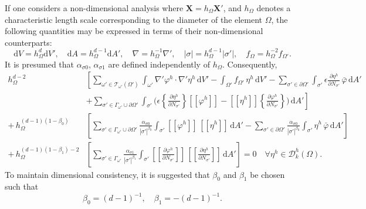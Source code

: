 	If one considers a non-dimensional analysis where $\bm{X} = h_\Omega \bm{X}'$, and $h_\Omega$ denotes a characteristic length scale corresponding to the diameter of the element $\Omega$, the following quantities may be expressed in terms of their non-dimensional counterparts:
    \begin{equation}
        \mathrm dV = h_\Omega^d \mathrm dV', \quad \mathrm dA = h_\Omega^{d-1} \mathrm dA', \quad \nabla = h_\Omega^{-1} \nabla', \quad |\sigma| = h_\Omega^{d-1} |\sigma'|, \quad f_{\Omega} = h_\Omega^{-2} f_{\Omega'}.
    \end{equation}
    It is presumed that $\alpha_{\sigma0}$, $\alpha_{\sigma1}$ are defined independently of $h_\Omega$. Consequently,
    \begin{align}
		h_\Omega^{d-2} & \left[ \sum_{\omega' \in \mathcal{T}_{\omega'} (\Omega')} \int_{\omega'} \nabla' \varphi^h \cdot \nabla' \eta^h \, \mathrm dV' - \int_{\Omega'} f_{\Omega'} \, \eta^h \, \mathrm dV' - \sum_{\sigma' \in \partial \Omega'} \int_{\sigma'} \epsilon \frac{\partial \eta^h}{\partial N_{\sigma'}} \, \bar{\varphi} \, \mathrm dA' \right. \nonumber \\ 
		& \left. + \sum_{\sigma' \in \Gamma_{\omega'} \cup \partial \Omega'} \int_{\sigma'} \bigg( \epsilon \left\{ \frac{\partial \eta^h}{\partial N_{\sigma'}} \right\} [\![ \varphi^h ]\!] - [\![ \eta^h ]\!] \left\{ \frac{\partial \varphi^h}{\partial N_{\sigma'}} \right\} \bigg) \, \mathrm dA' \right] \nonumber \\ 
		+ \, h_\Omega^{(d-1)(1-\beta_0)} & \left[ \sum_{\sigma' \in \Gamma_{\omega'} \cup \partial \Omega'} \frac{\alpha_{\sigma0}}{|\sigma'|^{\beta_0}} \int_{\sigma'} [\![ \varphi^h ]\!] \, [\![ \eta^h ]\!] \, \mathrm dA' - \sum_{\sigma' \in \partial \Omega'} \frac{\alpha_{\sigma0}}{|\sigma'|^{\beta_0}} \int_{\sigma'} \eta^h \, \bar{\varphi} \, \mathrm dA' \right] \nonumber \\ 
		+ \, h_\Omega^{(d-1)(1-\beta_1)-2} & \left[ \sum_{\sigma' \in \Gamma_{\omega'}} \frac{\alpha_{\sigma1}}{|\sigma'|^{\beta_1}} \int_{\sigma'} \left[\!\!\left[ \frac{\partial \varphi^h}{\partial N_{\sigma'}} \right]\!\!\right] \, \left[\!\!\left[ \frac{\partial \eta^h}{\partial N_{\sigma'}} \right]\!\!\right] \, \mathrm dA' \right] = 0 \quad \forall \eta^h \in \mathcal{D}^h_k (\Omega). 
		\label{eq:dg_nondim}
	\end{align}
	To maintain dimensional consistency, it is suggested that $\beta_0$ and $\beta_1$ be chosen such that
	\begin{equation}
		\beta_0 = (d-1)^{-1}, \quad \beta_1 = -(d-1)^{-1}.
	\end{equation}
	
